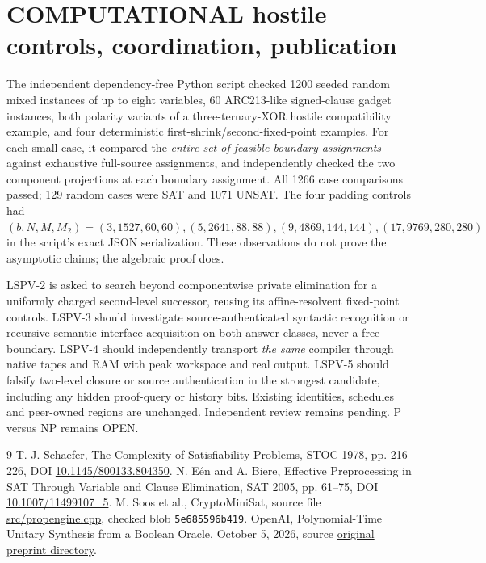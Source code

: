 \documentclass[11pt]{article}
\begin{document}
\section{COMPUTATIONAL hostile controls, coordination, publication}
The independent dependency-free Python script checked 1200 seeded random mixed instances of up to eight variables, 60 ARC213-like signed-clause gadget instances, both polarity variants of a three-ternary-XOR hostile compatibility example, and four deterministic first-shrink/second-fixed-point examples. For each small case, it compared the \emph{entire set of feasible boundary assignments} against exhaustive full-source assignments, and independently checked the two component projections at each boundary assignment. All 1266 case comparisons passed; 129 random cases were SAT and 1071 UNSAT. The four padding controls had $(b,N,M,M_2)=(3,1527,60,60),(5,2641,88,88),(9,4869,144,144),(17,9769,280,280)$ in the script's exact JSON serialization. These observations do not prove the asymptotic claims; the algebraic proof does.

LSPV-2 is asked to search beyond componentwise private elimination for a uniformly charged second-level successor, reusing its affine-resolvent fixed-point controls. LSPV-3 should investigate source-authenticated syntactic recognition or recursive semantic interface acquisition on both answer classes, never a free boundary. LSPV-4 should independently transport \emph{the same} compiler through native tapes and RAM with peak workspace and real output. LSPV-5 should falsify two-level closure or source authentication in the strongest candidate, including any hidden proof-query or history bits. Existing identities, schedules and peer-owned regions are unchanged. Independent review remains pending. P versus NP remains OPEN.

\begin{thebibliography}{9}
 T. J. Schaefer, The Complexity of Satisfiability Problems, STOC 1978, pp. 216--226, DOI \href{https://doi.org/10.1145/800133.804350}{10.1145/800133.804350}.
 N. E\'en and A. Biere, Effective Preprocessing in SAT Through Variable and Clause Elimination, SAT 2005, pp. 61--75, DOI \href{https://doi.org/10.1007/11499107_5}{10.1007/11499107\_5}.
 M. Soos et al., CryptoMiniSat, source file \href{https://github.com/msoos/cryptominisat/blob/master/src/propengine.cpp}{src/propengine.cpp}, checked blob \texttt{5e685596b419}.
 OpenAI, Polynomial-Time Unitary Synthesis from a Boolean Oracle, October 5, 2026, source \href{https://github.com/openai/math/tree/main/preprints/Polynomial-Time-Unitary-Synthesis-from-a-Boolean-Oracle-October-5-2026}{original preprint directory}.
\end{thebibliography}
\end{document}
